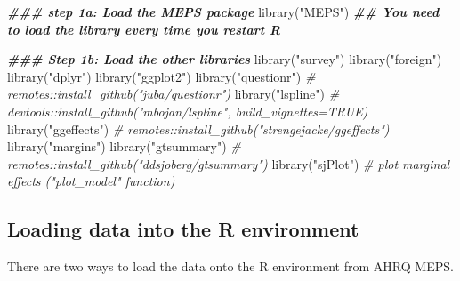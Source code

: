 \documentclass[
]{book}
\newenvironment{Shaded}{\begin{snugshade}}{\end{snugshade}}
\newcommand{\CommentTok}[1]{\textcolor[rgb]{0.56,0.35,0.01}{\textit{#1}}}
\newcommand{\DocumentationTok}[1]{\textcolor[rgb]{0.56,0.35,0.01}{\textbf{\textit{#1}}}}
\newcommand{\FunctionTok}[1]{\textcolor[rgb]{0.00,0.00,0.00}{#1}}
\newcommand{\NormalTok}[1]{#1}
\newcommand{\StringTok}[1]{\textcolor[rgb]{0.31,0.60,0.02}{#1}}
\begin{document}
\begin{Shaded}
\begin{Highlighting}[]
\DocumentationTok{\#\#\# step 1a: Load the MEPS package}
\FunctionTok{library}\NormalTok{(}\StringTok{"MEPS"}\NormalTok{) }\DocumentationTok{\#\# You need to load the library every time you restart R}

\DocumentationTok{\#\#\# Step 1b: Load the other libraries}
\FunctionTok{library}\NormalTok{(}\StringTok{"survey"}\NormalTok{)}
\FunctionTok{library}\NormalTok{(}\StringTok{"foreign"}\NormalTok{)}
\FunctionTok{library}\NormalTok{(}\StringTok{"dplyr"}\NormalTok{)}
\FunctionTok{library}\NormalTok{(}\StringTok{"ggplot2"}\NormalTok{)}
\FunctionTok{library}\NormalTok{(}\StringTok{"questionr"}\NormalTok{) }\CommentTok{\# remotes::install\_github("juba/questionr")}
\FunctionTok{library}\NormalTok{(}\StringTok{"lspline"}\NormalTok{)  }\CommentTok{\# devtools::install\_github("mbojan/lspline", build\_vignettes=TRUE)}
\FunctionTok{library}\NormalTok{(}\StringTok{"ggeffects"}\NormalTok{) }\CommentTok{\# remotes::install\_github("strengejacke/ggeffects")}
\FunctionTok{library}\NormalTok{(}\StringTok{"margins"}\NormalTok{)}
\FunctionTok{library}\NormalTok{(}\StringTok{"gtsummary"}\NormalTok{) }\CommentTok{\# remotes::install\_github("ddsjoberg/gtsummary")}
\FunctionTok{library}\NormalTok{(}\StringTok{"sjPlot"}\NormalTok{) }\CommentTok{\# plot marginal effects ("plot\_model" function)}
\end{Highlighting}
\end{Shaded}

\hypertarget{loading-data-into-the-r-environment}{%
\subsection{Loading data into the R environment}\label{loading-data-into-the-r-environment}}

There are two ways to load the data onto the R environment from AHRQ MEPS.
\end{document}
